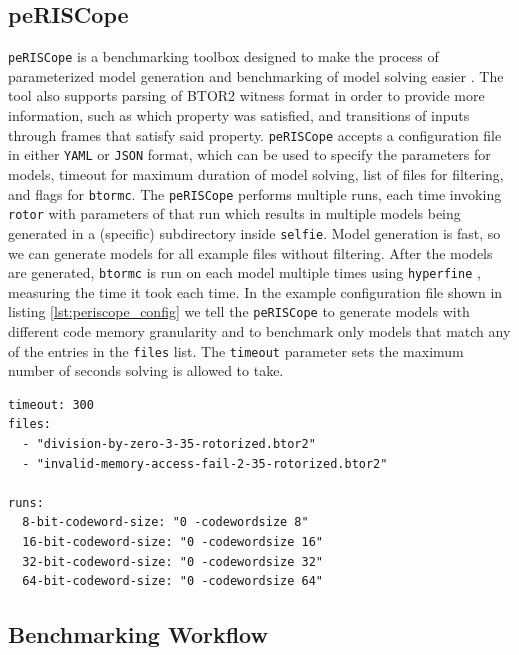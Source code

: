 \documentclass[12pt]{article}
\begin{document}
\subsection{peRISCope}

\texttt{peRISCope} is a benchmarking toolbox designed to make the process of 
parameterized model generation and benchmarking of model solving easier
\cite{Fejzic_peRISCope}. The tool also supports parsing of BTOR2 witness format
in order to provide more information, such as which property was satisfied, and
transitions of inputs through frames that satisfy said property.
\texttt{peRISCope} accepts a configuration file in either \texttt{YAML} or
\texttt{JSON} format, which can be used to specify the parameters for models,
timeout for maximum duration of model solving, list of files for filtering, and
flags for \texttt{btormc}. The \texttt{peRISCope} performs multiple runs,
each time invoking \texttt{rotor} with parameters of that run which results in
multiple models being generated in a (specific) subdirectory inside
\texttt{selfie}. Model generation is fast, so we can generate models for all
example files without filtering. After the models are generated,
\texttt{btormc} is run on each model multiple times using \texttt{hyperfine}
\cite{Peter_hyperfine_2023}, measuring the time it took each time. In the
example configuration file shown in listing \ref{lst:periscope_config} we tell
the \texttt{peRISCope} to generate models with different code memory
granularity and to benchmark only models that match any of the entries in the
\texttt{files} list. The \texttt{timeout} parameter sets the maximum number of
seconds solving is allowed to take.

\newpage
\begin{lstlisting}[label=lst:periscope_config, caption={Example peRISCope
                configuration file in \texttt{YAML} format}, captionpos=b]
timeout: 300
files:
  - "division-by-zero-3-35-rotorized.btor2"
  - "invalid-memory-access-fail-2-35-rotorized.btor2"

runs:
  8-bit-codeword-size: "0 -codewordsize 8"
  16-bit-codeword-size: "0 -codewordsize 16"
  32-bit-codeword-size: "0 -codewordsize 32"
  64-bit-codeword-size: "0 -codewordsize 64"
\end{lstlisting}

\subsection{Benchmarking Workflow}
\end{document}

